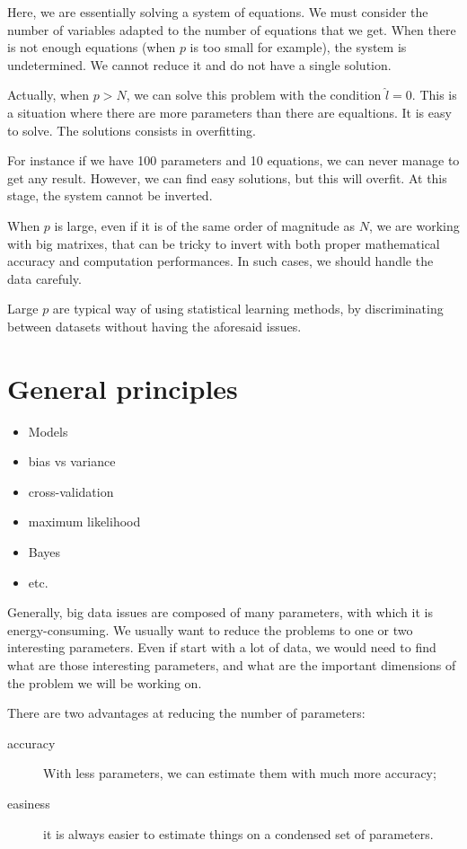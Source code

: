 \documentclass[a4paper]{tufte-book}
\begin{document}
Here, we are essentially solving a system of equations. We must consider the
number of variables adapted to the number of equations that we get. When there is
not enough equations (when $p$ is too small for example), the system is
undetermined. We cannot reduce it and do not have a single solution.

Actually, when $p>N$, we can solve this problem with the condition $\hat{l}=0$.
This is a situation where there are more parameters than there are equaltions. It
is easy to solve. The solutions consists in overfitting.

For instance if we have 100 parameters and 10 equations, we can never manage to
get any result. However, we can find easy solutions, but this will overfit.
At this stage, the system cannot be inverted.

When $p$ is large, even if it is of the same order of magnitude as $N$, we are
working with big matrixes, that can be tricky to invert with both proper
mathematical accuracy and computation performances. In such cases, we should
handle the data carefuly.

Large $p$ are typical way of using statistical learning methods, by
discriminating between datasets without having the aforesaid issues.


\chapter{General principles}
\label{ch:general-principles}

\begin{itemize}
    \item Models
    \item bias vs variance
    \item cross-validation
    \item maximum likelihood
    \item Bayes
    \item etc.
\end{itemize}


Generally, big data issues are composed of many parameters, with which it is
energy-consuming. We usually want to reduce the problems to one or two
interesting parameters. Even if start with a lot of data, we would need to find
what are those interesting parameters, and what are the important dimensions of
the problem we will be working on.

There are two advantages at reducing the number of parameters:
\begin{description}
    \item[accuracy] With less parameters, we can estimate them with much more
        accuracy;
    \item[easiness] it is always easier to estimate things on a condensed set
        of parameters.
\end{description}
\end{document}
